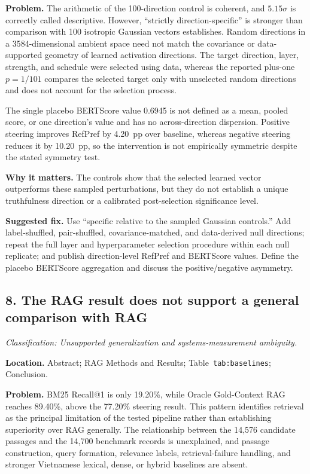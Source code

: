 \documentclass[11pt]{article}
\newcommand{\findinglabel}[1]{\textbf{#1}}
\newcommand{\classification}[1]{\textit{Classification: #1.}}
\begin{document}
\findinglabel{Problem.} The arithmetic of the 100-direction control is coherent, and $5.15\sigma$ is correctly called descriptive.  However, ``strictly direction-specific'' is stronger than comparison with 100 isotropic Gaussian vectors establishes.  Random directions in a 3584-dimensional ambient space need not match the covariance or data-supported geometry of learned activation directions.  The target direction, layer, strength, and schedule were selected using data, whereas the reported plus-one $p=1/101$ compares the selected target only with unselected random directions and does not account for the selection process.

The single placebo BERTScore value 0.6945 is not defined as a mean, pooled score, or one direction's value and has no across-direction dispersion.  Positive steering improves RefPref by 4.20~pp over baseline, whereas negative steering reduces it by 10.20~pp, so the intervention is not empirically symmetric despite the stated symmetry test.

\findinglabel{Why it matters.} The controls show that the selected learned vector outperforms these sampled perturbations, but they do not establish a unique truthfulness direction or a calibrated post-selection significance level.

\findinglabel{Suggested fix.} Use ``specific relative to the sampled Gaussian controls.''  Add label-shuffled, pair-shuffled, covariance-matched, and data-derived null directions; repeat the full layer and hyperparameter selection procedure within each null replicate; and publish direction-level RefPref and BERTScore values.  Define the placebo BERTScore aggregation and discuss the positive/negative asymmetry.

\subsection*{8. The RAG result does not support a general comparison with RAG}

\classification{Unsupported generalization and systems-measurement ambiguity}

\findinglabel{Location.} Abstract; RAG Methods and Results; Table~\texttt{tab:baselines}; Conclusion.

\findinglabel{Problem.} BM25 Recall@1 is only 19.20\%, while Oracle Gold-Context RAG reaches 89.40\%, above the 77.20\% steering result.  This pattern identifies retrieval as the principal limitation of the tested pipeline rather than establishing superiority over RAG generally.  The relationship between the 14,576 candidate passages and the 14,700 benchmark records is unexplained, and passage construction, query formation, relevance labels, retrieval-failure handling, and stronger Vietnamese lexical, dense, or hybrid baselines are absent.
\end{document}
